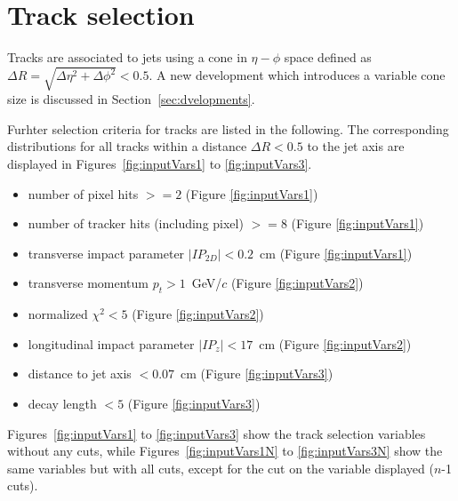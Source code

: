 \section{Track selection \label{sec:trackselection}}
Tracks are associated to jets using a cone in $\eta - \phi$ space defined as $\Delta R = \sqrt{\Delta \eta^2 + \Delta \phi^2} < 0.5$. A new development which introduces a variable cone size is discussed in Section~\ref{sec:dvelopments}. 

Furhter selection criteria for tracks are listed in the following. The corresponding distributions for all tracks within a distance $\Delta R < 0.5$ to the jet axis are displayed in Figures~\ref{fig:inputVars1} to \ref{fig:inputVars3}.
\begin{itemize}
\item number of pixel hits $>= 2$  (Figure \ref{fig:inputVars1})
\item number of tracker hits (including pixel) $>= 8$ (Figure \ref{fig:inputVars1})
\item transverse impact parameter $|IP_{2D}| < 0.2$~cm (Figure \ref{fig:inputVars1})
\item transverse momentum $p_t > 1$~GeV/$c$ (Figure \ref{fig:inputVars2})
\item normalized $\chi^2 < 5$ (Figure \ref{fig:inputVars2})
\item longitudinal impact parameter $|IP_{z}|< 17$~cm (Figure \ref{fig:inputVars2})
\item distance to jet axis $ < 0.07$~cm (Figure \ref{fig:inputVars3})
\item decay length $< 5$ (Figure \ref{fig:inputVars3})
\end{itemize}
Figures~\ref{fig:inputVars1} to \ref{fig:inputVars3} show the track selection variables without any cuts, while Figures~\ref{fig:inputVars1N} to \ref{fig:inputVars3N} show the same variables but with all cuts, except for the cut on the variable displayed ($n$-1 cuts).
